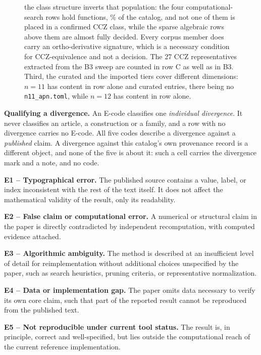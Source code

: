 \begin{figure}[tp]
{    the class structure inverts that population: the four computational-search
    rows hold \apnSearchRecords{} functions, \apnSearchShare\% of the catalog,
    and not one of them is placed in a confirmed CCZ class, while the sparse
    algebraic rows above them are almost fully decided.  Every corpus member
    does carry an ortho-derivative signature, which is a necessary condition
    for CCZ-equivalence and not a decision.  The 27 CCZ representatives
    extracted from the B3 sweep are counted in row C as well as in B3.  Third,
    the curated and the imported tiers cover different dimensions: $n=11$ has
    content in row \apnGroupsAtEleven{} alone and \apnCuratedAtEleven{} curated
    entries, there being no \texttt{n11\_apn.toml}, while $n=12$ has content in
    row \apnGroupsAtTwelve{} alone.}
  \label{fig:apn-heat}
\end{figure}


\noindent\textbf{Qualifying a divergence.}
An E-code classifies one \emph{individual divergence}.  It never classifies an
article, a construction or a family, and a row with no divergence carries no
E-code.  All five codes describe a divergence against a \emph{published}
claim.  A divergence against this catalog's own provenance record is a
different object, and none of the five is about it: such a cell carries the
divergence mark and a note, and no code.

\begin{list}{}{%
  \setlength{\leftmargin}{1.2em}\setlength{\itemindent}{-1.2em}%
  \setlength{\itemsep}{2pt}\setlength{\parsep}{0pt}\setlength{\topsep}{3pt}%
  \raggedright}
\item \textbf{E1 -- Typographical error.} The published source contains a value, label, or index inconsistent with the rest of the text itself. It does not affect the mathematical validity of the result, only its readability.
\item \textbf{E2 -- False claim or computational error.} A numerical or structural claim in the paper is directly contradicted by independent recomputation, with computed evidence attached.
\item \textbf{E3 -- Algorithmic ambiguity.} The method is described at an insufficient level of detail for reimplementation without additional choices unspecified by the paper, such as search heuristics, pruning criteria, or representative normalization.
\item \textbf{E4 -- Data or implementation gap.} The paper omits data necessary to verify its own core claim, such that part of the reported result cannot be reproduced from the published text.
\item \textbf{E5 -- Not reproducible under current tool status.} The result is, in principle, correct and well-specified, but lies outside the computational reach of the current reference implementation.
\end{list}

